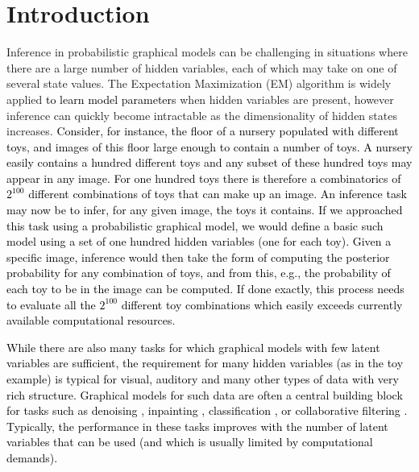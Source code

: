 \documentclass[12pt]{article}
\begin{document}
\graphicspath{{figs/}}

\newcommand{\rev}[1]{\textcolor{black}{#1}} %


\section{Introduction}
Inference in probabilistic graphical models can be challenging in situations where
there are a large number of hidden variables, each of which may take on one of several
state values. The Expectation Maximization (EM) algorithm is widely applied \rev{to learn model parameters} when hidden variables
are present, however inference can quickly become intractable as the dimensionality of hidden states increases.
%
\rev{Consider, for instance, the floor of a nursery populated with different toys, and images of this floor large enough to contain a number
of toys. A nursery easily contains a hundred different toys and any subset of these hundred toys may appear in any image. For one hundred toys there is therefore a combinatorics of $2^{100}$ different combinations of toys that can make up an image. An inference task may now be to infer, for any given image, the toys it contains. If we approached this task using a probabilistic graphical model, we would define a basic such model using a set of one hundred hidden variables (one for each toy). Given a specific image, inference would then take the form of computing the posterior probability for any combination of toys, and from this, e.g., the probability of each toy to be in the image can be computed.
If done exactly, this process needs to evaluate all the $2^{100}$ different toy combinations which easily exceeds currently available computational resources.}

\rev{While there are also many tasks for which graphical models with few latent variables are sufficient, the requirement for many hidden variables (as in the toy example) is typical for visual, auditory and many other types of data with very rich structure. 
Graphical models for such data 
 are often a central building block for tasks such as denoising \citep{EladAharon2006,TitsiasGredilla2011}, inpainting \citep{MairalEtAl2009, MairalEtAl2009b,TitsiasGredilla2011},  classification \citep{RainaEtAl2007}, or collaborative filtering \citep{TitsiasGredilla2011}. Typically, the performance in these tasks improves with the number of latent variables that can be used (and which is usually limited by computational demands).}
\end{document}
